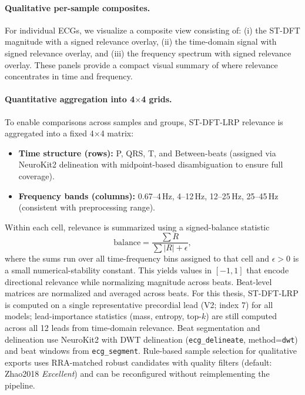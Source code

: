 \paragraph{Qualitative per-sample composites.}
For individual ECGs, we visualize a composite view consisting of:
(i) the ST-DFT magnitude with a signed relevance overlay,
(ii) the time-domain signal with signed relevance overlay, and
(iii) the frequency spectrum with signed relevance overlay.
These panels provide a compact visual summary of where relevance concentrates in time and frequency.

\paragraph{Quantitative aggregation into 4$\times$4 grids.}
To enable comparisons across samples and groups, ST-DFT-LRP relevance is aggregated into a fixed 4$\times$4 matrix:
\begin{itemize}
  \item \textbf{Time structure (rows):} P, QRS, T, and Between-beats (assigned via NeuroKit2 delineation with midpoint-based disambiguation to ensure full coverage).
  \item \textbf{Frequency bands (columns):} 0.67--4\,Hz, 4--12\,Hz, 12--25\,Hz, 25--45\,Hz (consistent with preprocessing range).
\end{itemize}
Within each cell, relevance is summarized using a signed-balance statistic
\[
  \mathrm{balance} = \frac{\sum R}{\sum |R| + \epsilon},
\]
where the sums run over all time-frequency bins assigned to that cell and \(\epsilon>0\) is a small numerical-stability constant.
This yields values in $[-1,1]$ that encode directional relevance while normalizing magnitude across beats.
Beat-level matrices are normalized and averaged across beats.
For this thesis, ST-DFT-LRP is computed on a single representative precordial lead (V2; index 7) for all models; lead-importance statistics (mass, entropy, top-$k$) are still computed across all 12 leads from time-domain relevance.
Beat segmentation and delineation use NeuroKit2 with DWT delineation (\texttt{ecg\_delineate}, method=\texttt{dwt}) and beat windows from \texttt{ecg\_segment}.
Rule-based sample selection for qualitative exports uses RRA-matched robust candidates with quality filters (default: Zhao2018 \textit{Excellent}) and can be reconfigured without reimplementing the pipeline.
